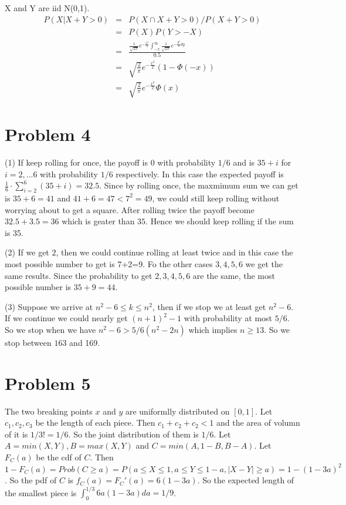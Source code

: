 \documentclass[12pt]{amsart}
\begin{document}
X and Y are iid N(0,1).
\begin{eqnarray*}
	P(X|X+Y>0) &=& P(X \cap X+Y>0)/P(X+Y>0) \\
	&=& P(X)P(Y>-X) \\
	&=& \frac{ \frac{1}{\sqrt{2\pi}}e^{-\frac{x^2}{2}} \int_{-x}^\infty \frac{1}{\sqrt{2\pi}}e^{-\frac{y^2}{2}dy}}{0.5} \\
	&=& \sqrt{\frac{2}{\pi}} e^{-\frac{x^2}{2}} (1- \Phi(-x)) \\
	&=& \sqrt{\frac{2}{\pi}} e^{-\frac{x^2}{2}} \Phi(x)
\end{eqnarray*}

\section{Problem 4}
(1) If keep rolling for once, the payoff is $0$ with probability $1/6$ and is $35+i$ for $i=2,...6$ with probability $1/6$ respectively. In this case the expected payoff is $\frac{1}{6}\cdot\sum_{i=2}^6(35+i)=32.5$. Since by rolling once, the maxmimum sum we can get is $35+6=41$ and $41+6=47<7^2=49$, we could still keep rolling without worrying about to get a square. After rolling twice the payoff become $32.5+3.5=36$ which is geater than $35$. Hence we should keep rolling if the sum is 35. 

(2) If we get $2$, then we could continue rolling at least twice and in this case the most possible number to get is 7+2=9. Fo the other cases $3,4,5,6$ we get the same results. Since the probability to get $2,3,4,5,6$ are the same, the most possible number is $35+9=44$.

(3) Suppose we arrive at $n^2-6\leq k\leq n^2$, then if we stop we at least get $n^2-6$. If we continue we could nearly get $(n+1)^2-1$ with probability at most $5/6$. So we stop when we have $n^2-6>5/6(n^2-2n)$ which implies $n\geq 13$. So we stop between $163$ and 169. 

\section{Problem 5}
The two breaking points $x$ and $y$ are uniformlly distributed on $[0,1]$. Let $c_1,c_2,c_3$ be the length of each piece. Then $c_1+c_2+c_2<1$ and the area of volumn of it is $1/3!=1/6$. So the joint distribution of them is $1/6$. Let $A=min(X,Y), B=max(X,Y)$ and $C=min(A,1-B,B-A)$. Let $F_C(a)$ be the cdf of $C$. Then $1-F_C(a)=Prob(C\geq a) = P(a\leq X\leq 1,a\leq Y\leq 1-a,|X-Y|\geq a)=1-(1-3a)^2$. So the pdf of $C$ is $f_C(a)=F_C'(a)=6(1-3a)$. So the expected length of the smallest piece is $\int_0^{1/3}6a(1-3a)da=1/9$.
\end{document}
